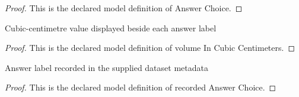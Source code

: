 \begin{proof}
  This is the declared model definition of Answer Choice.
\end{proof}
\begin{definition}
  \label{def:physics:phyx-mini-0404:phyxminiproblems-problemphyxmini0404-answerchoice-volumeincubiccentimeters}
  Cubic-centimetre value displayed beside each answer label
\end{definition}
\begin{proof}
  This is the declared model definition of volume In Cubic Centimeters.
\end{proof}
\begin{definition}
  \label{def:physics:phyx-mini-0404:phyxminiproblems-problemphyxmini0404-recordedanswerchoice}
  Answer label recorded in the supplied dataset metadata
\end{definition}
\begin{proof}
  This is the declared model definition of recorded Answer Choice.
\end{proof}
